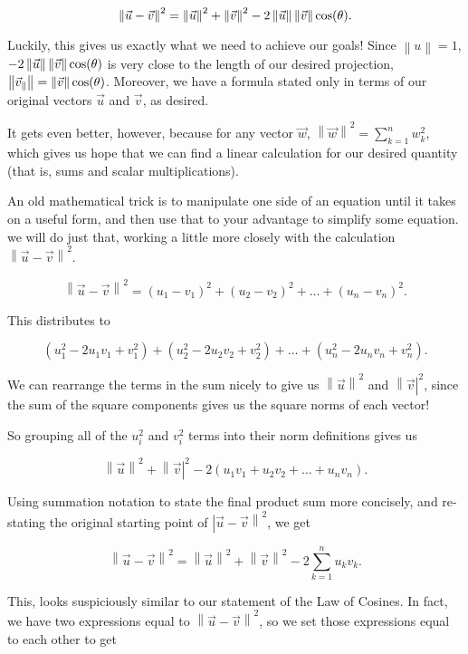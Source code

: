 \documentclass{ximera}
\begin{document}
\begin{explanation}
      $$\left\|\vec{u}-\vec{v}\right\|^2=\left\|\vec{u}\right\|^2+\left\|\vec{v}\right\|^2-2\left\|\vec{u}\right\|\left\|\vec{v}\right\|\cos(\theta).$$

      Luckily, this gives us exactly what we need to achieve our goals! Since $\left\|u\right\|=1$, $-2\left\|\vec{u}\right\|\left\|\vec{v}\right\|\cos(\theta)$ is very close to the length of our desired projection, $\left\|\vec{v}_\parallel\right\|=\left\|\vec{v}\right\|\cos(\theta)$. Moreover, we have a formula stated only in terms of our original vectors $\vec{u}$ and $\vec{v}$, as desired. 

      It gets even better, however, because for any vector $\vec{w}$, $\left\|\vec{w}\right\|^2=\sum_{k=1}^nw_k^2$, which gives us hope that we can find a linear calculation for our desired quantity (that is, sums and scalar multiplications).

      An old mathematical trick is to manipulate one side of an equation until it takes on a useful form, and then use that to your advantage to simplify some equation. we will do just that, working a little more closely with the calculation $\left\|\vec{u}-\vec{v}\right\|^2$.

      $$\left\|\vec{u}-\vec{v}\right\|^2=(u_1-v_1)^2+(u_2-v_2)^2+\ldots+(u_n-v_n)^2.$$

      This distributes to 

      $$(u_1^2-2u_1v_1+v_1^2)+(u_2^2-2u_2v_2+v_2^2)+\ldots+(u_n^2-2u_nv_n+v_n^2).$$

      We can rearrange the terms in the sum nicely to give us $\left\|\vec{u}\right\|^2$ and $\left\|\vec{v}\right|^2$, since the sum of the square components gives us the square norms of each vector!

      So grouping all of the $u_i^2$ and $v_i^2$ terms into their norm definitions gives us

      $$\left\|\vec{u}\right\|^2+\left\|\vec{v}\right|^2-2\left(u_1v_1+u_2v_2+\ldots+u_nv_n\right).$$

      Using summation notation to state the final product sum more concisely, and re-stating the original starting point of $\left|\vec{u}-\vec{v}\right\|^2$, we get

      $$\left\|\vec{u}-\vec{v}\right\|^2=\left\|\vec{u}\right\|^2+\left\|\vec{v}\right\|^2-2\sum_{k=1}^nu_kv_k.$$

      This, looks suspiciously similar to our statement of the Law of Cosines. In fact, we have two expressions equal to $\left\|\vec{u}-\vec{v}\right\|^2$, so we set those expressions equal to each other to get


\end{explanation}
\end{document}
